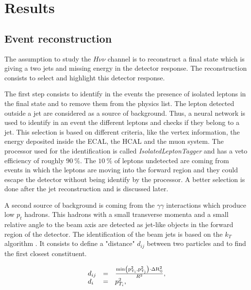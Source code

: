   \section{Results}
 
    \subsection{Event reconstruction}

    The assumption to study the $H \nu\nu$ channel is to reconstruct a final state which is giving a two jets and missing energy in the detector response.
    The reconstruction consists to select and highlight this detector response.

    The first step consists to identify in the events the presence of isolated leptons in the final state and to remove them from the physics list.
    The lepton detected outside a jet are considered as a source of background.
    Thus, a neural network is used to identify in an event the different leptons and checks if they belong to a jet.
    This selection is based on different criteria, like the vertex information, the energy deposited inside the \gls{ECAL}, the \gls{HCAL} and the muon system. 
    The processor used for the identification is called \textit{IsolatedLeptonTagger} and has a veto efficiency of roughly $90~\%$.
    The $10~\%$ of leptons undetected are coming from events in which the leptons are moving into the forward region and they could escape the detector without being identify by the processor.
    A better selection is done after the jet reconstruction and is discussed later.

    A second source of background is coming from the $\gamma \gamma$ interactions which produce low $p_{t}$ hadrons.
    This hadrons with a small transverse momenta and a small relative angle to the beam axis are detected as jet-like objects in the forward region of the detector.
    The identification of the beam jets is based on the $k_{T}$ algorithm \cite{Cacciari2008}.
    It consists to define a "distance" $d_{ij}$ between two particles and to find the first closest constituent.
    
    \begin{equation}
      \begin{array}{lcl}
        d_{ij} & = & \frac{\rm{min}\left(p^2_{T_i}, p^2_{T_j}\right) \cdot \Delta R^2_{ij}}{R^2}, \\
        d_{i}  & = & p^2_{T_i},
      \end{array}
    \end{equation}

